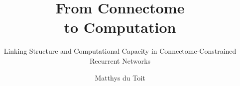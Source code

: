 \documentclass{layout/tudelft-report}
\begin{document}
    \frontmatter

    \title{From Connectome \\to Computation}
    \subtitle{Linking Structure and Computational Capacity in Connectome-Constrained Recurrent Networks}
    \author{Matthys du Toit }
    \subject{Thesis Report}

    \makecover
    \afterpage{\blankpage}
    
    
    
    

    
    

    
    
    
    \tableofcontents    
    \listoffigures
    \listoftables

    \mainmatter
    
      
                
        
    
    
     
    
    
    
    
    \printbibliography[title=References]

    
    \appendix
    
    
    

    
    
\end{document}

